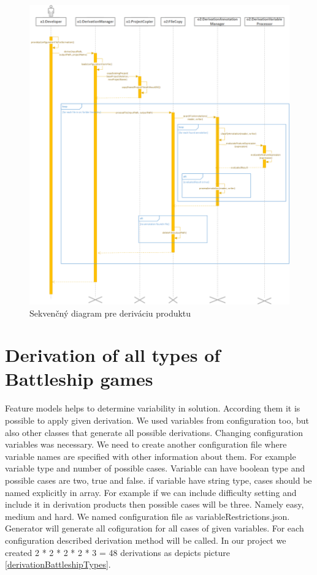 \documentclass[11pt,slovak,a4paper,twoside]{article}
\begin{document}
\begin{figure}[!t]  %
					\begin{center}
									\includegraphics[width=\linewidth]{fig/derivationProcess.png}
									\caption{Sekvenčný diagram pre deriváciu produktu}
									\label{derivationProductSequenceDiagram}
					\end{center}
\end{figure}


\section{Derivation of all types of Battleship games} \label{allDerivations}

Feature models helps to determine variability in solution. According them it is possible to apply given derivation. We used variables from configuration too, but also other classes that generate all possible derivations. Changing configuration variables was necessary. We need to create another configuration file where variable names are specified with other information about them. For example variable type and number of possible cases. Variable can have boolean type and possible cases are two, true and false. if variable have string type, cases should be named explicitly in array. For example if we can include difficulty setting and include it in derivation products then possible cases will be three. Namely easy, medium and hard. We named configuration file as variableRestrictions.json. Generator will generate all cofiguration for all cases of given variables. For each configuration described derivation method will be called. In our project we created 2 * 2 * 2 * 2 * 3 = 48 derivations as depicts picture \ref{derivationBattleshipTypes}.  
\end{document}

